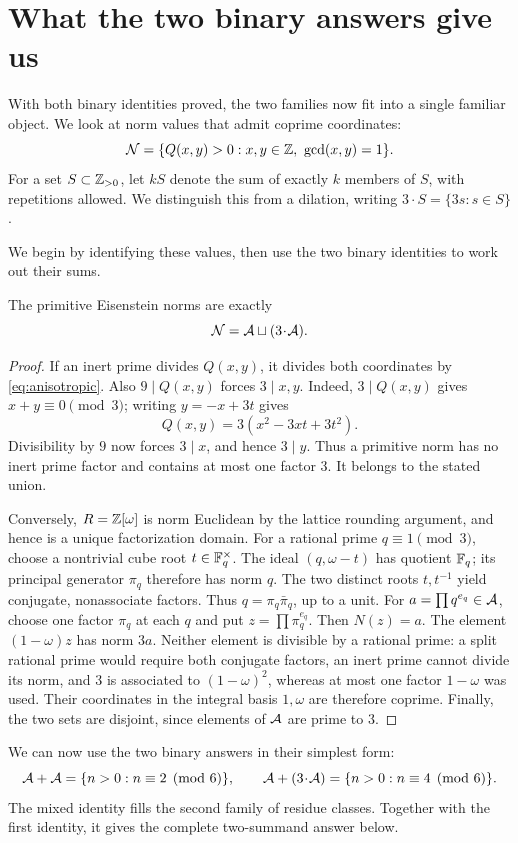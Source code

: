 \section{What the two binary answers give us}\label{sec:primitive-sumsets}
With both binary identities proved, the two families now fit into a
single familiar object. We look at norm values that admit coprime
coordinates:
\[
\NN=\{Q(x,y)>0:x,y\in\Z,\ \gcd(x,y)=1\}.
\]
For a set $S\subset\Z_{>0}$, let $kS$ denote the sum of exactly $k$
members of $S$, with repetitions allowed. We distinguish this from a
dilation, writing $3\!\cdot\! S=\{3s:s\in S\}$.

We begin by identifying these values, then use the two binary identities
to work out their sums.

\begin{proposition}\label{prop:primitive-classification}
The primitive Eisenstein norms are exactly
\[
\NN=\AA\sqcup(3\!\cdot\!\AA).
\]
\end{proposition}
\begin{proof}
If an inert prime divides $Q(x,y)$, it divides both coordinates by
\eqref{eq:anisotropic}. Also $9\mid Q(x,y)$ forces $3\mid x,y$.
Indeed, $3\mid Q(x,y)$ gives $x+y\equiv0\pmod3$; writing
$y=-x+3t$ gives
\[
Q(x,y)=3(x^2-3xt+3t^2).
\]
Divisibility by $9$ now forces $3\mid x$, and hence $3\mid y$.
Thus a primitive norm has no inert prime factor and contains at most
one factor $3$. It belongs to the stated union.

Conversely, $R=\Z[\omega]$ is norm Euclidean by the lattice rounding
argument, and hence is a unique factorization domain. For a rational
prime $q\equiv1\pmod3$, choose a nontrivial cube root
$t\in\F_q^\times$. The ideal $(q,\omega-t)$ has quotient $\F_q$;
its principal generator $\pi_q$ therefore has norm $q$. The two distinct
roots $t,t^{-1}$ yield conjugate, nonassociate factors. Thus
$q=\pi_q\bar\pi_q$, up to a unit.
For $a=\prod q^{e_q}\in\AA$, choose one factor $\pi_q$ at each $q$ and
put $z=\prod\pi_q^{e_q}$. Then $N(z)=a$. The element
$(1-\omega)z$ has norm $3a$. Neither element is divisible by a rational
prime: a split rational prime would require both conjugate factors,
an inert prime cannot divide its norm, and $3$ is associated to
$(1-\omega)^2$, whereas at most one factor $1-\omega$ was used.
Their coordinates in the integral basis $1,\omega$ are therefore
coprime. Finally, the two sets are disjoint, since elements of $\AA$
are prime to $3$.
\end{proof}

We can now use the two binary answers in their simplest form:
\begin{equation}\label{eq:binary-input-sumsets}
\AA+\AA=\{n>0:n\equiv2\pmod6\},\qquad
\AA+(3\!\cdot\!\AA)=\{n>0:n\equiv4\pmod6\}.
\end{equation}
The mixed identity fills the second family of residue classes. Together
with the first identity, it gives the complete two-summand answer below.

